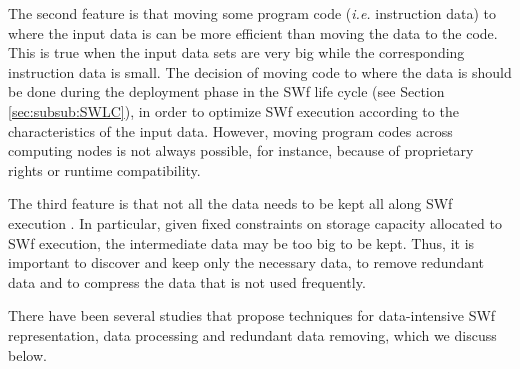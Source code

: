 The second feature is that moving some program code (\textit{i.e.} instruction data)
to where the input data is can be more efficient than moving the
data to the code. This is true when the input data sets are very big while the
corresponding instruction data is small.
The decision of moving code to where the data is
should be done during the deployment phase in
the SWf life cycle (see Section \ref{sec:subsub:SWLC}), in order to optimize SWf
execution according to the characteristics of the input data.
However,
moving program codes across computing nodes is not always possible,
for instance, because of proprietary rights or runtime compatibility.


The third feature is that not all the data needs to be kept all along
SWf execution \cite{Deelman2014}. In particular, given fixed constraints on
storage capacity allocated to SWf execution, the intermediate
data may be too big to be kept. Thus, it is important to discover
and keep only the necessary data, to remove redundant data and to
compress the data that is not used frequently. 

There have been several studies that propose techniques for data-intensive
SWf representation, data processing and redundant data removing,
which we discuss below.

